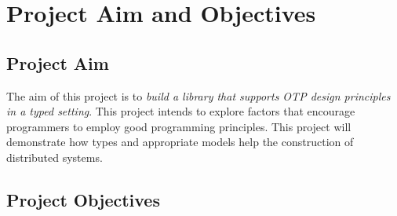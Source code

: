 \section{Project Aim and Objectives}

\subsection{Project Aim}
\label{aim}
The aim of this project is to {\it{build a library that supports OTP design principles in a typed setting}}. This project intends to explore factors that encourage programmers to employ good programming principles.  This project will demonstrate how types and appropriate models help the construction of distributed systems.

\subsection{Project Objectives}
\label{objectives}

